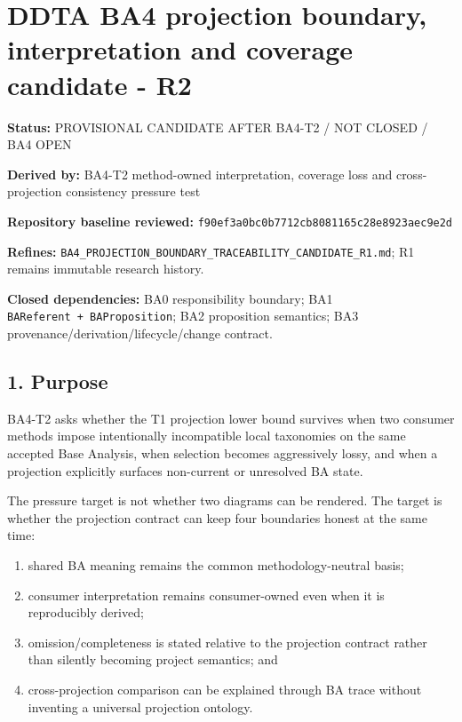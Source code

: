 \documentclass[11pt,a4paper]{article}
\providecommand{\tightlist}{\setlength{\itemsep}{0pt}\setlength{\parskip}{0pt}}
\begin{document}
\section{DDTA BA4 projection boundary, interpretation and coverage
candidate -
R2}\label{ddta-ba4-projection-boundary-interpretation-and-coverage-candidate---r2}

\textbf{Status:} PROVISIONAL CANDIDATE AFTER BA4-T2 / NOT CLOSED / BA4
OPEN

\textbf{Derived by:} BA4-T2 method-owned interpretation, coverage loss
and cross-projection consistency pressure test

\textbf{Repository baseline reviewed:}
\texttt{f90ef3a0bc0b7712cb8081165c28e8923aec9e2d}

\textbf{Refines:}
\texttt{BA4\_PROJECTION\_BOUNDARY\_TRACEABILITY\_CANDIDATE\_R1.md}; R1
remains immutable research history.

\textbf{Closed dependencies:} BA0 responsibility boundary; BA1
\texttt{BAReferent\ +\ BAProposition}; BA2 proposition semantics; BA3
provenance/derivation/lifecycle/change contract.

\subsection{1. Purpose}\label{1-purpose}

BA4-T2 asks whether the T1 projection lower bound survives when two
consumer methods impose intentionally incompatible local taxonomies on
the same accepted Base Analysis, when selection becomes aggressively
lossy, and when a projection explicitly surfaces non-current or
unresolved BA state.

The pressure target is not whether two diagrams can be rendered. The
target is whether the projection contract can keep four boundaries
honest at the same time:

\begin{enumerate}
\def\labelenumi{\arabic{enumi}.}
\tightlist
\item
  shared BA meaning remains the common methodology-neutral basis;
\item
  consumer interpretation remains consumer-owned even when it is
  reproducibly derived;
\item
  omission/completeness is stated relative to the projection contract
  rather than silently becoming project semantics; and
\item
  cross-projection comparison can be explained through BA trace without
  inventing a universal projection ontology.
\end{enumerate}
\end{document}
